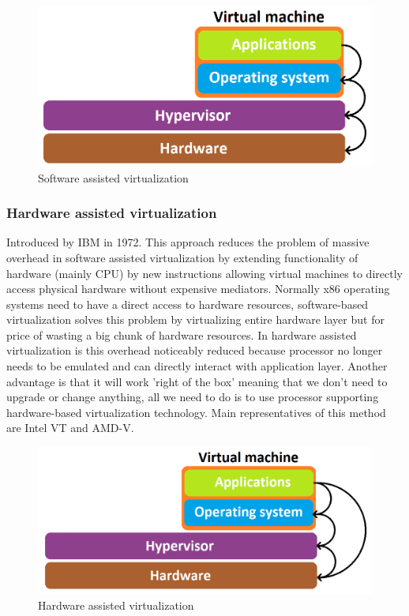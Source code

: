 \begin{figure}[H]
\centering
\includegraphics[scale=0.4]{sw-assist.png}
\caption{Software assisted virtualization}
\end{figure}

\subsubsection{Hardware assisted virtualization}
Introduced by IBM in 1972. This approach reduces the problem of massive overhead in software assisted virtualization by extending functionality of hardware (mainly CPU) by new instructions allowing virtual machines to directly access physical hardware without expensive mediators. Normally x86 operating systems need to have a direct access to hardware resources, software-based virtualization solves this problem by virtualizing entire hardware layer but for price of wasting a big chunk of hardware resources. In hardware assisted virtualization is this overhead noticeably reduced because processor no longer needs to be emulated and can directly interact with application layer. Another advantage is that it will work 'right of the box' meaning that we don't need to upgrade or change anything, all we need to do is to use processor supporting hardware-based virtualization technology. Main representatives of this method are Intel VT and AMD-V.

\begin{figure}[H]
\centering
\includegraphics[scale=0.4]{hw-assist.png}
\caption{Hardware assisted virtualization}
\end{figure}

